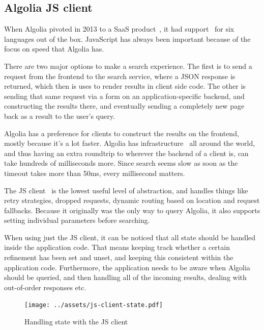 \subsection{Algolia JS client} %
\label{sub:algolia_js_client}

When Algolia pivoted in 2013 to a SaaS product~\cite{algolia-blog-saas}, it had support~\cite{algolia-blog-lauch} for six languages out of the box. JavaScript has always been important because of the focus on speed that Algolia has.

There are two major options to make a search experience. The first is to send a request from the frontend to the search service, where a JSON response is returned, which then is uses to render results in client side code. The other is sending that same request via a form on an application-specific backend, and constructing the results there, and eventually sending a completely new page back as a result to the user's query.

Algolia has a preference for clients to construct the results on the frontend, mostly because it's a lot faster. Algolia has infrastructure~\cite{algolia-infra} all around the world, and thus having an extra roundtrip to wherever the backend of a client is, can take hundreds of milliseconds more. Since search seems slow as soon as the timeout takes more than 50ms, every millisecond matters.

The JS client~\cite{algolia-js-client} is the lowest useful level of abstraction, and handles things like retry strategies, dropped requests, dynamic routing based on location and request fallbacks. Because it originally was the only way to query Algolia, it also supports setting individual parameters before searching.

When using just the JS client, it can be noticed that all state should be handled inside the application code. That means keeping track whether a certain refinement has been set and unset, and keeping this consistent within the application code. Furthermore, the application needs to be aware when Algolia should be queried, and then handling all of the incoming results, dealing with out-of-order responses etc.

\begin{figure}[H]
\label{figure:js-client-state}
  \centering
  \texttt{[image: ../assets/js-client-state.pdf]}
  \caption{Handling state with the JS client}
\end{figure}


